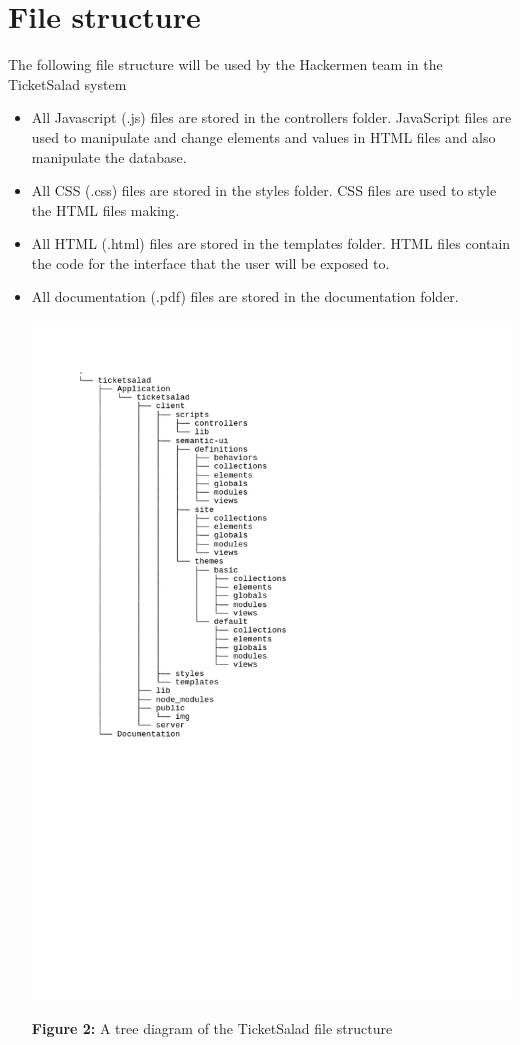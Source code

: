 \documentclass[11pt]{article}
\begin{document}
	\section{File structure}
	{The following file structure will be used  by the Hackermen team in the TicketSalad system}
	\begin{itemize}
		\item All Javascript (.js) files are stored in the controllers folder. JavaScript files are used to manipulate and change elements and values in HTML files and also manipulate the database.
		\item All CSS (.css) files are stored in the styles folder. CSS files are used to style the HTML files making.
		\item All HTML (.html) files are stored in the templates folder. HTML files contain the code for the interface that the user will be exposed to.
		\item All documentation (.pdf) files are stored in the documentation folder.
		
		\includegraphics[scale=0.4]{tree}
		
		\caption{    \textbf{Figure 2:} A tree diagram of the TicketSalad file structure}
	\end{itemize}
	\newpage
\end{document}
